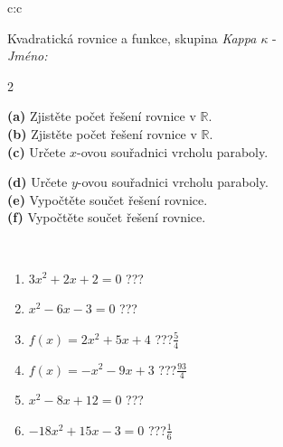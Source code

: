 \documentclass[10pt]{report}
\begin{document}
\begin{tabular}{c:c}
\begin{minipage}[c][104.5mm][t]{0.5\linewidth}
\begin{center}
\vspace{7mm}
{\huge \LARGE Kvadratická rovnice a funkce, skupina \textit{Kappa $\kappa$} -}\\[5mm]
\textit{Jméno:}\phantom{xxxxxxxxxxxxxxxxxxxxxxxxxxxxxxxxxxxxxxxxxxxxxxxxxxxxxxxxxxxxxxxxx}\\[5mm]
\begin{minipage}{0.95\linewidth}
\begin{center}
{\small \begin{multicols}{2} \raggedright
\textbf{(a)} Zjistěte počet řešení rovnice v \(\mathbb{R}\). \\[1mm]
\textbf{(b)} Zjistěte počet řešení rovnice v \(\mathbb{R}\). \\[1mm]
\textbf{(c)} Určete \(x\)-ovou souřadnici vrcholu paraboly. \par \columnbreak
\textbf{(d)} Určete \(y\)-ovou souřadnici vrcholu paraboly. \\[1mm]
\textbf{(e)} Vypočtěte součet řešení rovnice. \\[1mm]
\textbf{(f)} Vypočtěte součet řešení rovnice.
\end{multicols}
}
\end{center}
\end{minipage}
\\[4mm]
\begin{minipage}{0.79\linewidth}
\begin{center}
\begin{varwidth}{\linewidth}
\begin{enumerate}
\Large
\item $3x^2+2x+2=0$\quad \dotfill\; ???\;\dotfill {}
\item $x^2-6x-3=0$\quad \dotfill\; ???\;\dotfill {}
\item $f(x)=2x^2+5x+4$\quad \dotfill\; ???\;\dotfill \quad $\frac{5}{4}$
\item $f(x)=-x^2-9x+3$\quad \dotfill\; ???\;\dotfill \quad $\frac{93}{4}$
\item $x^2-8x+12=0$\quad \dotfill\; ???\;\dotfill {}
\item $-18x^2+15x-3=0$\quad \dotfill\; ???\;\dotfill \quad $\frac{1}{6}$
\end{enumerate}
\end{varwidth}
\end{center}

\end{minipage}
\end{center}
\end{minipage}
\end{tabular}
\end{document}
